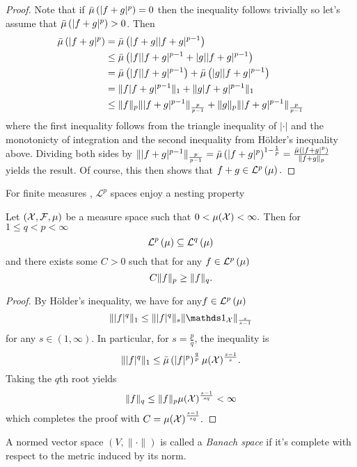 \begin{proof}
Note that if $\bar{\mu}\left(\lvert f+g\rvert^{p}\right)=0$ then the inequality
follows trivially so let's assume that $\bar{\mu}\left(\lvert f+g\rvert^{p}\right)>0$.
Then
\begin{align*}
\bar{\mu}\left(\lvert f+g\lvert^{p}\right) & =\bar{\mu}\left(\lvert f+g\rvert\lvert f+g\rvert^{p-1}\right)\\
 & \leq\bar{\mu}\left(\lvert f\rvert\lvert f+g\rvert^{p-1}+\lvert g\rvert\lvert f+g\rvert^{p-1}\right)\\
 & =\bar{\mu}\left(\lvert f\rvert\lvert f+g\rvert^{p-1}\right)+\bar{\mu}\left(\lvert g\rvert\lvert f+g\rvert^{p-1}\right)\\
 & =\lVert f\lvert f+g\rvert^{p-1}\rVert_{1}+\lVert g\lvert f+g\rvert^{p-1}\rVert_{1}\\
 & \leq\lVert f\rVert_{p}\lVert\lvert f+g\rvert^{p-1}\rVert_{\frac{p}{p-1}}+\lVert g\rVert_{p}\lVert\lvert f+g\rvert^{p-1}\rVert_{\frac{p}{p-1}}
\end{align*}
where the first inequality follows from the triangle inequality of
$\lvert\cdot\rvert$ and the monotonicty of integration and the second
inequality from H\"{o}lder's inequality above. Dividing both sides
by $\lVert\lvert f+g\rvert^{p-1}\rVert_{\frac{p}{p-1}}=\bar{\mu}\left(\lvert f+g\rvert^{p}\right)^{1-\frac{1}{p}}=\frac{\bar{\mu}\left(\lvert f+g\lvert^{p}\right)}{\lVert f+g\rVert_{p}}$
yields the result. Of course, this then shows that $f+g\in\mathcal{L}^{p}\left(\mu\right).$
\end{proof}
For finite measures , $\mathcal{L}^{p}$ spaces enjoy a nesting property
\begin{prop}
\label{prop:nestingLpSpace}Let $(\mathcal{X},\mathcal{F},\mu)$ be a measure space
such that $0<\mu(\mathcal{X})<\infty.$ Then for $1\leq q<p<\infty$
\[
\mathcal{L}^{p}\left(\mu\right)\subseteq\mathcal{L}^{q}\left(\mu\right)
\]
and there exists some $C>0$ such that for any $f\in\mathcal{L}^{p}\left(\mu\right)$
\[
C\lVert f\rVert_{p}\geq\lVert f\rVert_{q}.
\]
\end{prop}

\begin{proof}
By H\"{o}lder's inequality, we have for any$f\in\mathcal{L}^{p}\left(\mu\right)$
\[
\pnorm{\lvert f\rvert{}^{q}}1\leq\pnorm{\lvert f\rvert{}^{q}}s\pnorm{\indicate_{\X}}{\frac{s}{s-1}}
\]
for any $s\in(1,\infty)$. In particular, for $s=\frac{p}{q}$, the
inequality is
\[
\lVert\lvert f\rvert{}^{q}\rVert_{1}\leq\bar{\mu}\left(\lvert f\rvert^{p}\right)^{\frac{q}{p}}\mu(\mathcal{X})^{\frac{s-1}{s}}.
\]
Taking the $q$th root yields
\[
\lVert f\rVert_{q}\leq\lVert f\rVert_{p}\mu(\mathcal{X})^{\frac{s-1}{sq}}<\infty
\]
which completes the proof with $C=\mu(\mathcal{X})^{\frac{s-1}{sq}}.$
\end{proof}
\begin{defn}
\label{def:banachSpace}A normed vector space $\left(V,\|\cdot\|\right)$
is called a \emph{Banach space }if it's complete with respect to the
metric induced by its norm.
\end{defn}

